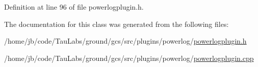 \-Definition at line 96 of file powerlogplugin.\-h.



\-The documentation for this class was generated from the following files\-:\begin{DoxyCompactItemize}
\item 
/home/jb/code/\-Tau\-Labs/ground/gcs/src/plugins/powerlog/\hyperlink{powerlogplugin_8h}{powerlogplugin.\-h}\item 
/home/jb/code/\-Tau\-Labs/ground/gcs/src/plugins/powerlog/\hyperlink{powerlogplugin_8cpp}{powerlogplugin.\-cpp}\end{DoxyCompactItemize}
